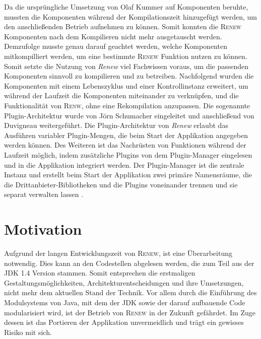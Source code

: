 	Da die ursprüngliche Umsetzung von Olaf Kummer auf Komponenten beruhte, mussten die Komponenten während der Kompilationszeit hinzugefügt werden, um den anschließenden Betrieb aufnehmen zu können. Somit konnten die \textsc{Renew} Komponenten nach dem Kompilieren nicht mehr ausgetauscht werden.\newline
	Demzufolge musste genau darauf geachtet werden, welche Komponenten mitkompilliert werden, um eine bestimmte \textsc{Renew} Funktion nutzen zu können. Somit setzte die Nutzung von \textit{Renew} viel Fachwissen voraus, um die passenden Komponenten sinnvoll zu kompilieren und zu betreiben. \newline 
	Nachfolgend wurden die Komponenten mit einem Lebenszyklus und einer Kontrollinstanz erweitert, um während der Laufzeit die Komponenten miteinander zu verknüpfen, und die Funktionalität von \textsc{Renw}, ohne eine Rekompilation anzupassen. Die sogenannte Plugin-Architektur wurde von Jörn Schumacher \cite{Schumacher03} eingeleitet und anschließend von Duvigneau \cite{Duvigneau09} weitergeführt.\newline
	Die Plugin-Architektur von \textit{Renew} erlaubt das Ausführen variabler Plugin-Mengen, die beim Start der Applikation angegeben werden können. Des Weiteren ist das Nachrüsten von Funktionen während der Laufzeit möglich, indem zusätzliche Plugins von dem Plugin-Manager eingelesen und in die Applikation integriert werden. Der Plugin-Manager ist die zentrale Instanz und erstellt beim Start der Applikation zwei primäre Namensräume, die die Drittanbieter-Bibliotheken und die Plugins voneinander trennen und sie separat verwalten lassen \cite{Duvigneau09}.

\section{Motivation} \label{sec:motivation1}
	Aufgrund der langen Entwicklungszeit von \textsc{Renew}, ist eine Überarbeitung notwendig. Dies kann an den Codestellen abgelesen werden, die zum Teil aus der JDK 1.4 Version stammen. Somit entsprechen die erstmaligen Gestaltungsmöglichkeiten, Architekturentscheidungen und ihre Umsetzungen, nicht mehr dem aktuellen Stand der Technik. Vor allem durch die Einführung des Modulsystems von Java, mit dem der JDK sowie der darauf aufbauende Code modularisiert wird, ist der Betrieb von \textsc{Renew} in der Zukunft gefährdet. Im Zuge dessen ist das Portieren der Applikation unvermeidlich und trägt ein gewisses Risiko mit sich.

